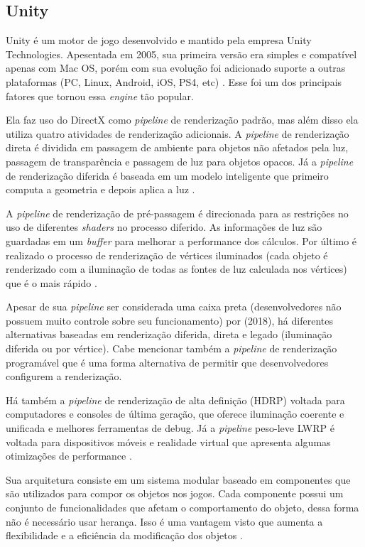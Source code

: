 \subsection{Unity}
\label{sec:unity}

Unity é um motor de jogo desenvolvido e mantido pela empresa Unity Technologies. Apesentada em 2005, sua primeira versão era simples e compatível apenas com Mac OS, porém com sua evolução foi adicionado suporte a outras plataformas (PC, Linux, Android, iOS, PS4, etc) \cite{compStudyGE}. Esse foi um dos principais fatores que tornou essa \textit{engine} tão popular.

Ela faz uso do DirectX como \textit{pipeline} de renderização padrão, mas além disso ela utiliza quatro atividades de renderização adicionais. A \textit{pipeline} de renderização direta é dividida em passagem de ambiente para objetos não afetados pela luz, passagem de transparência e passagem de luz para objetos opacos. Já a \textit{pipeline} de renderização diferida é baseada em um modelo inteligente que primeiro computa a geometria e depois aplica a luz \cite{simon2015unity}.

A \textit{pipeline} de renderização de pré-passagem é direcionada para as restrições no uso de diferentes \textit{shaders} no processo diferido. As informações de luz são guardadas em um \textit{buffer} para melhorar a performance dos cálculos. Por último é realizado o processo de renderização de vértices iluminados (cada objeto é renderizado com a iluminação de todas as fontes de luz calculada nos vértices) que é o mais rápido \cite{simon2015unity}. 

Apesar de sua \textit{pipeline} ser considerada uma caixa preta (desenvolvedores não possuem muito controle sobre seu funcionamento) por  (2018), há diferentes alternativas baseadas em renderização diferida, direta e legado (iluminação diferida ou por vértice). Cabe mencionar também a \textit{pipeline} de renderização programável que é uma forma alternativa de permitir que desenvolvedores configurem a renderização.

Há também a \textit{pipeline} de renderização de alta definição (\acrshort{HDRP}) voltada para computadores e consoles de última geração, que oferece iluminação coerente e unificada e melhores ferramentas de debug. Já a \textit{pipeline} peso-leve \acrshort{LWRP} é voltada para dispositivos móveis e realidade virtual que apresenta algumas otimizações de performance \cite{hasu2018modern}.

Sua arquitetura consiste em um sistema modular baseado em componentes que são utilizados para compor os objetos nos jogos. Cada componente possui um conjunto de funcionalidades que afetam o comportamento do objeto, dessa forma não é necessário usar herança. Isso é uma vantagem visto que aumenta a flexibilidade e a eficiência da modificação dos objetos \cite{compStudyGE}.

